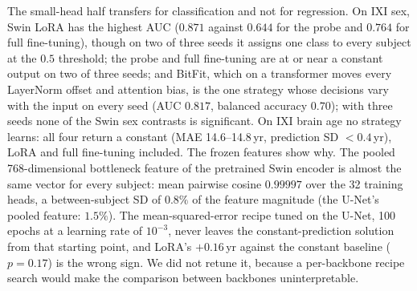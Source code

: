 \iffull\documentclass[journal]{IEEEtran}\else\documentclass[journal,twoside,web]{ieeecolor}\usepackage{generic}\fi
\begin{document}
The small-head half transfers for classification and not for regression. On IXI sex, Swin LoRA has the highest AUC ($0.871$ against $0.644$ for the probe and $0.764$ for full fine-tuning), though on two of three seeds it assigns one class to every subject at the $0.5$ threshold; the probe and full fine-tuning are at or near a constant output on two of three seeds; and BitFit, which on a transformer moves every LayerNorm offset and attention bias, is the one strategy whose decisions vary with the input on every seed (AUC $0.817$, balanced accuracy $0.70$); with three seeds none of the Swin sex contrasts is significant. On IXI brain age no strategy learns: all four return a constant (MAE 14.6--14.8\,yr, prediction SD $<0.4$\,yr), LoRA and full fine-tuning included. The frozen features show why. The pooled 768-dimensional bottleneck feature of the pretrained Swin encoder is almost the same vector for every subject: mean pairwise cosine $0.99997$ over the 32 training heads, a between-subject SD of $0.8\%$ of the feature magnitude (the U-Net's pooled feature: $1.5\%$). The mean-squared-error recipe tuned on the U-Net, 100 epochs at a learning rate of $10^{-3}$, never leaves the constant-prediction solution from that starting point, and LoRA's $+0.16$\,yr against the constant baseline ($p=0.17$) is the wrong sign. We did not retune it, because a per-backbone recipe search would make the comparison between backbones uninterpretable.

\end{document}
